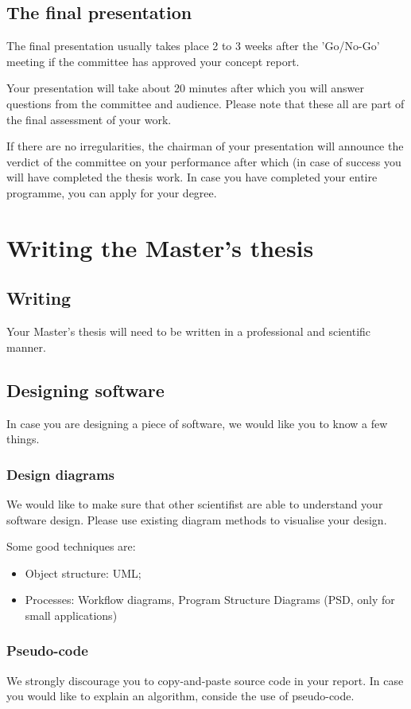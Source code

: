 \documentclass{latex-format/stylesheets/BEMNextstyle}
\begin{document}
\subsection*{The final presentation}
The final presentation usually takes place 2 to 3 weeks after the 'Go/No-Go' meeting if the committee has approved your concept report.

Your presentation will take about 20 minutes after which you will answer questions from the committee and audience. Please note that these all are part of the final assessment of your work.

If there are no irregularities, the chairman of your presentation will announce the verdict of the committee on your performance after which (in case of success you will have completed the thesis work. In case you have completed your entire programme, you can apply for your degree.

\section*{Writing the Master's thesis}
\subsection*{Writing}
Your Master's thesis will need to be written in a professional and scientific manner.

\subsection*{Designing software}
In case you are designing a piece of software, we would like you to know a few things.

\subsubsection*{Design diagrams}
We would like to make sure that other scientifist are able to understand your software design. Please use existing diagram methods to visualise your design.

Some good techniques are:
\begin{itemize}
\item Object structure: UML;
\item Processes: Workflow diagrams, Program Structure Diagrams (PSD, only for small applications)
\end{itemize}

\subsubsection*{Pseudo-code}
We strongly discourage you to copy-and-paste source code in your report. In case you would like to explain an algorithm, conside the use of pseudo-code.
\end{document}
